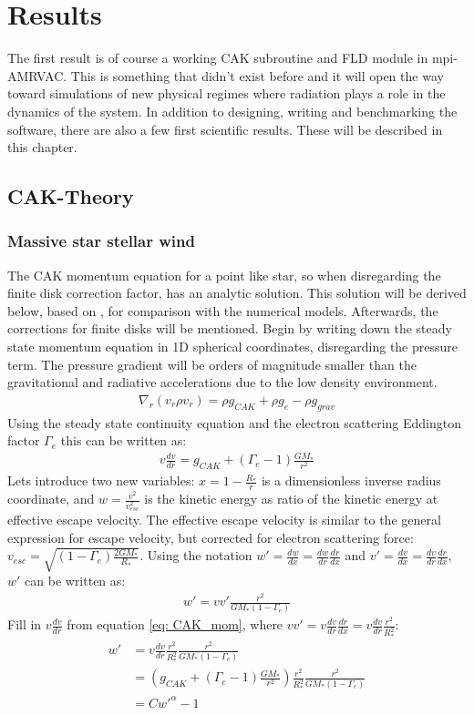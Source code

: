 \chapter{Results}
The first result is of course a working CAK subroutine and FLD module in mpi-AMRVAC. This is something that didn't exist before and it will open the way toward simulations of new physical regimes where radiation plays a role in the dynamics of the system. In addition to   designing, writing and benchmarking the software, there are also a few first scientific results. These will be described in this chapter.

\section{CAK-Theory}
\subsection{Massive star stellar wind}
The CAK momentum equation for a point like star, so when disregarding the finite disk correction factor, has an analytic solution. This solution will be derived below, based on \citep{Owocki2003}, for comparison with the numerical models. Afterwards, the corrections for finite disks will be mentioned. Begin by writing down the steady state momentum equation in 1D spherical coordinates, disregarding the pressure term. The pressure gradient will be orders of magnitude smaller than the gravitational and radiative accelerations due to the low density environment. 
\begin{align}
\nabla_r \left(v_r \rho v_r \right) = \rho g_{CAK} + \rho g_{e} - \rho g_{grav}
\end{align}
Using the steady state continuity equation and the electron scattering Eddington factor $\Gamma_e$ this can be written as:
\begin{align}
v \frac{d v}{d r} = g_{CAK} + (\Gamma_e-1) \frac{G M_*}{r^2} \label{eq: CAK_mom}
\end{align}
Lets introduce two new variables: $x = 1- \frac{R_*}{r}$ is a dimensionless inverse radius coordinate, and $w = \frac{v^2}{v_{esc}^2}$ is the kinetic energy as ratio of the kinetic energy at effective escape velocity. The effective escape velocity is similar to the general expression for escape velocity, but corrected for electron scattering force: $v_{esc} = \sqrt{(1- \Gamma_e) \frac{2 G M_* }{R_*}}$. Using the notation $w' = \frac{dw}{dx} = \frac{dw}{dr}\frac{dr}{dx}$ and $v' = \frac{dv}{dx} = \frac{dv}{dr} \frac{dr}{dx}$, $w'$ can be written as:
\begin{align}
w' = vv' \frac{r^2}{G M_* (1- \Gamma_e)}
\end{align}
Fill in $v\frac{dv}{dr}$ from equation \eqref{eq: CAK_mom}, where $vv' = v \frac{dv}{dr} \frac{dr}{dx} = v \frac{dv}{dr} \frac{r^2}{R_*^2}$:
\begin{align}
w' &= v \frac{dv}{dr}  \frac{r^2}{R_*^2} \frac{r^2}{G M_* (1- \Gamma_e)} \\
   &= \left( g_{CAK} + (\Gamma_e-1) \frac{G M_*}{r^2} \right)  \frac{r^2}{R_*^2} \frac{r^2}{G M_* (1- \Gamma_e)}\\
   &= C w'^\alpha - 1 \label{eq: CAK_w}
\end{align}

